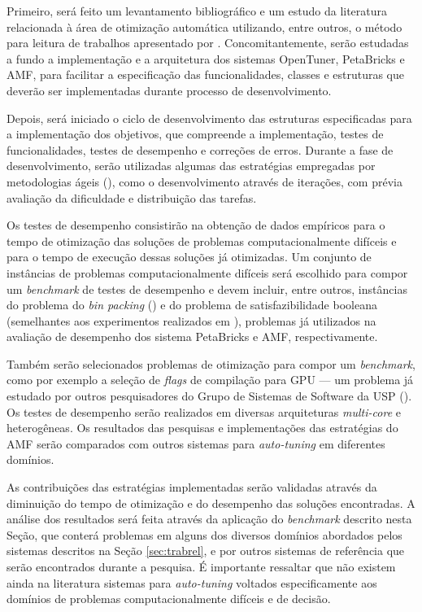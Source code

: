 \documentclass[a4paper, 12pt]{article}
\begin{document}
Primeiro, será feito um levantamento bibliográfico e um estudo da literatura
relacionada à área de otimização automática utilizando, entre outros, o método
para leitura de trabalhos apresentado por \citet{keshav2007howtoread}.
Concomitantemente, serão  estudadas a fundo a implementação e a arquitetura dos
sistemas OpenTuner, PetaBricks e AMF, para facilitar a especificação das
funcionalidades, classes e estruturas que deverão ser implementadas durante
processo de desenvolvimento.

Depois, será iniciado o ciclo de desenvolvimento das estruturas especificadas
para a implementação dos objetivos, que compreende a implementação,
testes de funcionalidades, testes de desempenho e correções de erros.
Durante a fase de desenvolvimento, serão utilizadas algumas das estratégias
empregadas por metodologias ágeis (\citet{beck2000extreme}), como o
desenvolvimento através de iterações, com prévia avaliação da dificuldade e
distribuição das tarefas.

Os testes de desempenho consistirão na obtenção de dados empíricos para o tempo
de otimização das soluções de problemas computacionalmente difíceis e para o
tempo de execução dessas soluções já otimizadas. Um conjunto de instâncias de
problemas computacionalmente difíceis será escolhido para compor
um \emph{benchmark} de testes de desempenho e devem incluir, entre outros,
instâncias do problema do \emph{bin packing} (\citet{de1981bin}) e do problema
de satisfazibilidade booleana (semelhantes aos experimentos realizados em
\citet{goldman2011optimizing}), problemas já utilizados na avaliação de
desempenho dos sistema PetaBricks e AMF, respectivamente.

Também serão selecionados problemas de otimização para compor um
\emph{benchmark}, como por exemplo a seleção de \emph{flags} de compilação para
GPU --- um problema já estudado por outros pesquisadores do Grupo de Sistemas
de Software da USP (\citet{marcosFAPESP}). Os testes de desempenho serão
realizados em diversas arquiteturas \emph{multi-core} e heterogêneas. Os
resultados das pesquisas e implementações das estratégias do AMF serão
comparados com outros sistemas para \emph{auto-tuning} em diferentes domínios.

As contribuições das estratégias implementadas serão validadas através da
diminuição do tempo de otimização e do desempenho das soluções encontradas.
A análise dos resultados será feita através da aplicação do \emph{benchmark}
descrito nesta Seção, que conterá problemas em alguns dos diversos domínios
abordados pelos sistemas descritos na Seção \ref{sec:trabrel}, e por outros
sistemas de referência que serão encontrados durante a pesquisa. É importante
ressaltar que não existem ainda na literatura sistemas para \emph{auto-tuning}
voltados especificamente aos domínios de problemas computacionalmente difíceis
e de decisão.
\end{document}
